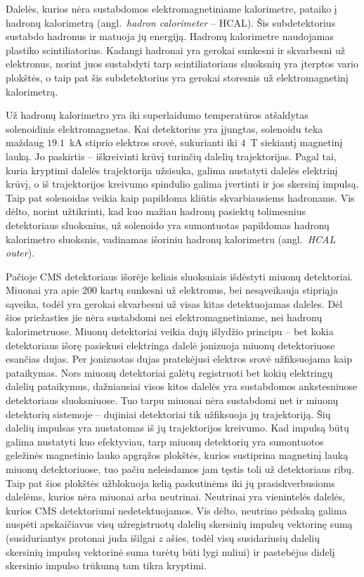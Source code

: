 \documentclass[a4paper, 12pt, oneside]{article}
\begin{document}
Dalelės, kurios nėra sustabdomos elektromagnetiniame kalorimetre, pataiko į hadronų kalorimetrą (angl.\ \textit{hadron calorimeter} -- HCAL).
Šis subdetektorius sustabdo hadronus ir matuoja jų energiją.
Hadronų kalorimetre naudojamas plastiko scintiliatorius.
Kadangi hadronai yra gerokai sunkesni ir skvarbesni už elektronus, norint juos sustabdyti tarp scintiliatoriaus sluoksnių yra įterptos
vario plokštės, o taip pat šis subdetektorius yra gerokai storesnis už elektromagnetinį kalorimetrą.

Už hadronų kalorimetro yra iki superlaidumo temperatūros atšaldytas solenoidinis elektromagnetas.
Kai detektorius yra įjungtas, solenoidu teka maždaug $19.1$~kA stiprio elektros srovė, sukurianti iki $4$~T siekiantį magnetinį lauką.
Jo paskirtis -- iškreivinti krūvį turinčių dalelių trajektorijas.
Pagal tai, kuria kryptimi dalelės trajektorija užsisuka, galima nustatyti dalelės elektrinį krūvį,
o iš trajektorijos kreivumo spindulio galima įvertinti ir jos skersinį impulsą.
Taip pat solenoidas veikia kaip papildoma kliūtis skvarbiausiems hadronams.
Vis dėlto, norint užtikrinti, kad kuo mažiau hadronų pasiektų tolimesnius detektoriaus sluoksnius, už
solenoido yra sumontuotas papildomas hadronų kalorimetro sluoksnis, vadinamas išoriniu hadronų kalorimetru
(angl.\ \textit{HCAL outer}).

Pačioje CMS detektoriaus išorėje keliais sluoksniais išdėstyti miuonų detektoriai.
Miuonai yra apie $200$ kartų sunkesni už elektronus, bei nesąveikauja stipriąja sąveika, todėl yra gerokai skvarbesni
už visas kitas detektuojamas daleles.
Dėl šios priežasties jie nėra sustabdomi nei elektromagnetiniame, nei hadronų kalorimetruose.
Miuonų detektoriai veikia dujų išlydžio principu -- bet kokia detektoriaus išorę pasiekusi elektringa dalelė jonizuoja
miuonų detektoriuose esančias dujas.
Per jonizuotas dujas pratekėjusi elektros srovė užfiksuojama kaip pataikymas.
Nors miuonų detektoriai galėtų registruoti bet kokių elektringų dalelių pataikymus, dažniausiai visos
kitos dalelės yra sustabdomos ankstesniuose detektoriaus sluoksniuose.
Tuo tarpu miuonai nėra sustabdomi net ir miuonų detektorių sistemoje -- dujiniai detektoriai tik užfiksuoja jų
trajektoriją.
Šių dalelių impulsas yra nustatomas iš jų trajektorijos kreivumo.
Kad impulsą būtų galima nustatyti kuo efektyviau, tarp miuonų detektorių yra sumontuotos geležinės magnetinio
lauko apgrąžos plokštės, kurios sustiprina magnetinį lauką miuonų detektoriuose, tuo pačiu neleisdamos jam tęstis toli
už detektoriaus ribų.
Taip pat šios plokštės užblokuoja kelią paskutinėms iki jų prasiskverbusioms dalelėms, kurios nėra miuonai
arba neutrinai.
Neutrinai yra vienintelės dalelės, kurios CMS detektoriumi nedetektuojamos.
Vis dėlto, neutrino pėdsaką galima nuspėti apskaičiavus visų užregistruotų dalelių skersinių impulsų vektorinę sumą
(susiduriantys protonai juda išilgai $z$ ašies, todėl visų susidariusių dalelių skersinių impulsų vektorinė suma turėtų
būti lygi nuliui) ir pastebėjus didelį skersinio impulso trūkumą tam tikra kryptimi.
\end{document}

